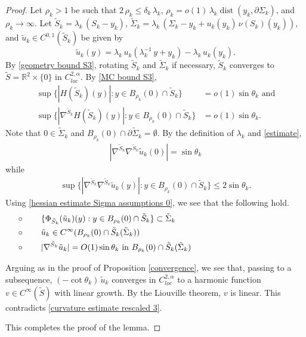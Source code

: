 \documentclass[11pt]{amsart}
\begin{document}
\begin{proof}
Let $\rho_k>1$ be such that $2\,\rho_k\leq\delta_k\,\lambda_k$, $\rho_k=o(1)\,\lambda_k\operatorname{dist}(y_k,\partial \Sigma_k)$, and $\rho_k\to\infty$.
		Let $\tilde S_k=\lambda_k\,(S_k-y_k)$, $\tilde \Sigma_k=\lambda_k\,(\Sigma_k-y_k+u_k(y_k)\,\nu(S_k)(y_k))$, and $\tilde u_k\in C^{0,1}(\tilde S_k)$ be given by 
	$$
	\tilde u_k(y)=\lambda_k\,u_k\left(\lambda_k^{-1}\,y+y_k\right)-\lambda_k\,u_k(y_k).
	$$
	By \eqref{geometry bound S3}, rotating $\tilde S_k$ and $\tilde \Sigma_k$ if necessary, $\tilde S_k$ converges  to $\tilde S=\mathbb{R}^2\times\{0\}$  in $C_{loc}^{2,\alpha}$. By \eqref{MC bound S3},
\begin{align*} 
	\sup\{|H(\tilde S_k)(y)|:y\in B_{\rho_k}(0)\cap \tilde S_k\}&=o(1)\sin\theta_k\text{ and}\\
	\sup\{|\nabla^{\tilde S_k}H(\tilde S_k)(y)|:y\in B_{\rho_k}(0)\cap \tilde S_k\}&=o(1)\sin\theta_k.
\end{align*}
Note that $0\in \tilde \Sigma_k$ and  $B_{\rho_k}(0)\cap \partial \tilde \Sigma_k=\emptyset$. By  the definition of $\lambda_k$  and \eqref{estimate},
	\begin{align} \label{curvature estimate rescaled 3} 
		|\nabla^{\tilde S_k}\nabla^{\tilde S_k}\tilde u_k(0)|=\sin\theta_k
	\end{align} 
	while
	\begin{align*}
		\sup\{|\nabla^{\tilde S_k}\nabla^{\tilde S_k}\tilde u_k(y)|:y\in B_{\rho_k}(0)\cap \tilde S_k\}\leq 2\sin\theta_k.
	\end{align*}
	 Using \eqref{hessian estimate Sigma assumptions 0}, we see that the following hold.
	 \begin{equation*}
	 	\begin{aligned}
	 		&\circ\qquad \text{$ \{\Phi_{\tilde S_k}(\tilde u_k)(y):y\in B_{\rho_k}(0)\cap   {\tilde S}_k\}\subset \tilde \Sigma_k$}\hspace{5cm}\\ 			 	
	 		&\circ\qquad \text{$ \tilde u_k\in C^\infty(B_{\rho_k}(0)\cap \tilde S_k(\tilde \Sigma_k))$}\\ 
	 		&\circ\qquad \text{$|\nabla^{\tilde S_k} \tilde u_k|=O(1) \sin\theta_k$ in $ B_{\rho_k}(0)\cap  {\tilde S}_k(\tilde \Sigma_k)$}
	 	\end{aligned}
	 \end{equation*}

Arguing as in the proof of Proposition \ref{convergence}, we see that, passing to a subsequence, $(-\cot\theta_k)\,\tilde u_k$ converges in $C_{loc}^{2,\alpha}$ to a harmonic function $v\in C^\infty(\tilde S)$ with linear growth. By the Liouville theorem, $v$ is linear.  This contradicts \eqref{curvature estimate rescaled 3}.
	
	This completes the proof of the lemma.	
\end{proof}
\end{document}
